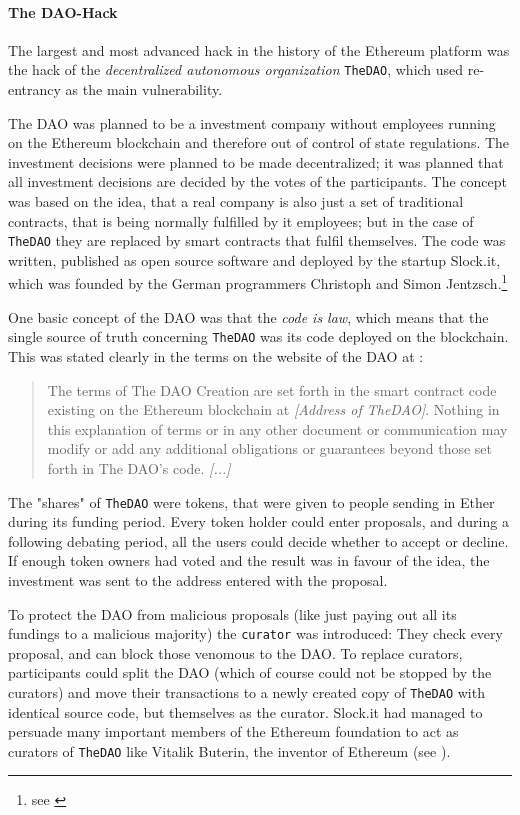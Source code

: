 \paragraph{The DAO-Hack}
The largest and most advanced hack in the history of the Ethereum platform was the hack of the \textit{decentralized autonomous organization} \texttt{TheDAO}, which used re-entrancy as the main vulnerability.

The DAO was planned to be a investment company without employees running on the Ethereum blockchain and therefore out of control of state regulations. The investment decisions were planned to be made decentralized; it was planned that all investment decisions are decided by the votes of the participants. The concept was based on the idea, that a real company is also just a set of traditional contracts, that is being normally fulfilled by it employees; but in the case of \texttt{TheDAO} they are replaced by smart contracts that fulfil themselves. The code was written, published as open source software and deployed by the startup Slock.it, which was founded by the German programmers Christoph and Simon Jentzsch.\footnote{see \cite{zeit:dao}}

One basic concept of the DAO was that the \textit{code is law}, which means that the single source of truth concerning \texttt{TheDAO} was its code deployed on the blockchain. This was stated clearly in the terms on the website of the DAO at \cite{dao:terms}:
\begin{quotation}
	The terms of The DAO Creation are set forth in the smart contract code existing on the Ethereum blockchain at \textit{[Address of TheDAO]}. Nothing in this explanation of terms or in any other document or communication may modify or add any additional obligations or guarantees beyond those set forth in The DAO’s code. \textit{[...]}
\end{quotation}

The "shares" of \texttt{TheDAO} were tokens, that were given to people sending in Ether during its funding period. Every token holder could enter proposals, and during a following debating period, all the users could decide whether to accept or decline. If enough token owners had voted and the result was in favour of the idea, the investment was sent to the address entered with the proposal.

To protect the DAO from malicious proposals (like just paying out all its fundings to a malicious majority) the \texttt{curator} was introduced: They check every proposal, and can block those venomous to the DAO. To replace curators, participants could split the DAO (which of course could not be stopped by the curators) and move their transactions to a newly created copy of \texttt{TheDAO} with identical source code, but themselves as the curator. Slock.it had managed to persuade many important members of the Ethereum foundation to act as curators of \texttt{TheDAO} like Vitalik Buterin, the inventor of Ethereum (see \cite{slockit:curators}).


